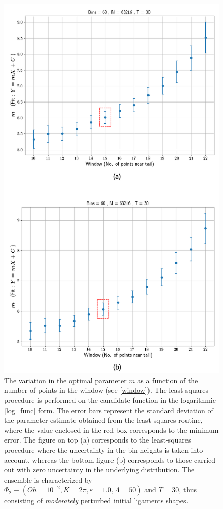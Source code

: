 

\begin{figure}
\centering
	\includegraphics{plots/drop_stats/determine_fit_log.pdf}
\caption{
	The variation in the optimal parameter $m$ as a 
	function of the number of points in the window (see \ref{window}).
	The least-squares procedure is performed on the 
	candidate function in the logarithmic \eqref{log_func} form.
	The error bars represent the standard deviation of the 
	parameter estimate obtained from the least-squares routine,
	where the value enclosed in the red box corresponds to the minimum error.
	The figure on top (a) corresponds to the least-squares procedure where the 
	uncertainty in the bin heights is taken into account, whereas the bottom 
	figure (b) corresponds to those carried out with zero uncertainty in the underlying distribution. 
	The ensemble is characterized by $\Phi_2 \equiv \left( Oh = 10^{-2}, K = 2\pi 
	, \varepsilon = 1.0 , \Lambda = 50 \right)$ and $T = 30$, 
	thus consisting of \textit{moderately} perturbed initial ligaments shapes. 
	}
\label{determine_log}
\end{figure}

